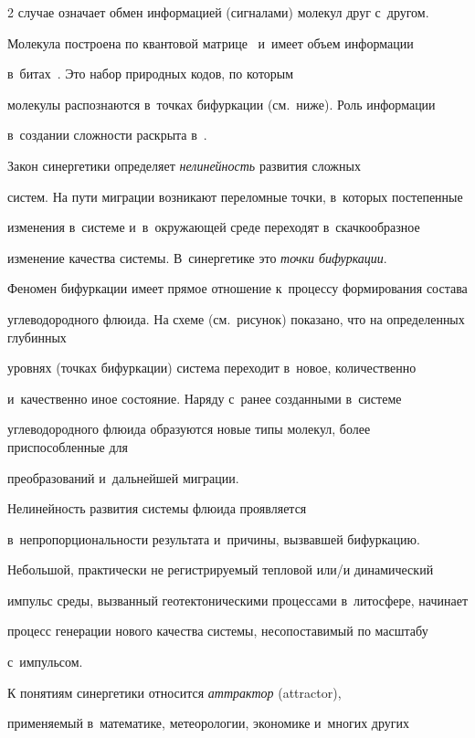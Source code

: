 \begin{multicols}{2}
случае означает обмен информацией (сигналами) молекул друг с~другом. 

Молекула построена по квантовой матрице~\cite{3-s} и~имеет объем информации 

в~битах~\cite[с.~129--132]{2-s}. Это набор природных кодов, по которым 

молекулы распознаются в~точках бифуркации (см.\ ниже). Роль информации 

в~создании сложности раскрыта в~\cite[с.~212--217]{8-s}.

    

    Закон синергетики определяет \textit{нелинейность} развития сложных 

систем. На пути миграции возникают переломные точки, в~которых постепенные 

изменения в~системе и~в~окружающей среде переходят в~скачкообразное 

изменение качества системы. В~синергетике это \textit{точки бифуркации}. 

Феномен бифуркации имеет прямое отношение к~процессу формирования со\-ста\-ва  

углеводородного флю\-ида. На схеме (см.\ рисунок) показано, что на определенных глубинных 

уровнях (точках бифуркации) система переходит в~новое, количественно 

и~качественно иное состояние. Наряду с~ранее созданными в~сис\-те\-ме  

углеводородного флю\-ида образуются новые типы молекул, более приспособленные для 

преобразований и~дальнейшей миграции.

    

    Нелинейность развития системы флюида проявляется 

в~непропорциональности результата и~причины, вызвавшей бифуркацию. 

Небольшой, практически не регистрируемый тепловой или/и динамический 

импульс среды, вызванный геотектоническими процессами в~литосфере, начинает 

процесс генерации нового качества системы, несопоставимый по масштабу 

с~импульсом.

    

    К понятиям синергетики относится \textit{аттрактор} (attractor), 

применяемый в~математике, метеорологии, экономике и~многих других 


\end{multicols}
